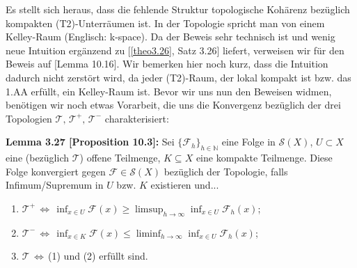 Es stellt sich heraus, dass die fehlende Struktur topologische Kohärenz bezüglich kompakten (T2)-Unterräumen ist. In der Topologie spricht man von einem Kelley-Raum (Englisch: k-space). Da der Beweis sehr technisch ist und wenig neue Intuition ergänzend zu [\ref{theo3.26}, Satz 3.26] liefert, verweisen wir für den Beweis auf \cite{MasoGamma}[Lemma 10.16]. Wir bemerken hier noch kurz, dass die Intuition dadurch nicht zerstört wird, da jeder (T2)-Raum, der lokal kompakt ist bzw. das 1.AA erfüllt, ein Kelley-Raum ist. Bevor wir uns nun den Beweisen widmen, benötigen wir noch etwas Vorarbeit, die uns die Konvergenz bezüglich der drei Topologien \(\mathcal{T}, \, \mathcal{T}^+, \, \mathcal{T}^-\) charakterisiert:\\[0.5cm]
\colorbox{generalYellow}{\begin{minipage}{16cm}{\textcolor{black}{}{\label{lem3.27}}}
\textbf{Lemma 3.27 \cite{MasoGamma}[Proposition 10.3]:} Sei \(\{\mathcal{F}_h\}_{h \in \mathbb{N}}\) eine Folge in \(\mathcal{S}(X)\), \(U \subset X\) eine (bezüglich \(\mathcal{T}\)) offene Teilmenge, \(K \subseteq X\) eine kompakte Teilmenge. Diese Folge konvergiert gegen \(\mathcal{F} \in \mathcal{S}(X)\) bezüglich der Topologie, falls Infimum/Supremum in \(U\) bzw. \(K\) existieren und...
\begin{enumerate}
    \item \(\mathcal{T}^+ \, \Leftrightarrow \, \inf_{x \in U} \mathcal{F}(x) \geq \limsup_{h \to \infty} \inf_{x \in U} \mathcal{F}_h(x)\);
    \item \(\mathcal{T}^- \, \Leftrightarrow \, \inf_{x \in K} \mathcal{F}(x) \leq \liminf_{h \to \infty} \inf_{x \in U} \mathcal{F}_h(x)\);
    \item \(\mathcal{T} \, \Leftrightarrow \,\)(1) und (2) erfüllt sind.
\end{enumerate}
\end{minipage}}

